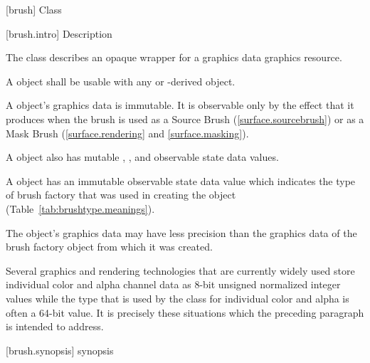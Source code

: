  [brush] {Class }

 [brush.intro] { Description}

\pnum
{}
The class  describes an opaque wrapper for a graphics data graphics resource.

\pnum
A  object shall be usable with any  or -derived object.

\pnum
A  object's graphics data is immutable. It is observable only by the effect that it produces when the brush is used as a Source Brush (\ref{surface.sourcebrush}) or as a Mask Brush (\ref{surface.rendering} and \ref{surface.masking}).

\pnum
A  object also has mutable , , and  observable state data values.

\pnum
A  object has an immutable  observable state data value which indicates the type of brush factory that was used in creating the  object (Table~\ref{tab:brushtype.meanings}).

\pnum
The  object's graphics data may have less precision than the graphics data of the brush factory object from which it was created.

\pnum
\enterexample
Several graphics and rendering technologies that are currently widely used store individual color and alpha channel data as 8-bit unsigned normalized integer values while the  type that is used by the  class for individual color and alpha is often a 64-bit value. It is precisely these situations which the preceding paragraph is intended to address.
\exitexample

 [brush.synopsis] { synopsis}

